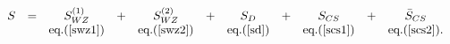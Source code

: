 \begin{equation*}
  \begin{array}{ccccccccccc}
  S &=& S^{(1)}_{WZ}&+&S^{(2)}_{WZ}&+&S_D&+&S_{CS}&+&\bar S_{CS}\\
  && \textrm{eq.(\ref{swz1})} && \textrm{eq.(\ref{swz2})} && \textrm{eq.(\ref{sd})} &&
  \textrm{eq.(\ref{scs1})} &&\textrm{eq.(\ref{scs2})}.
\end{array}
\end{equation*}

